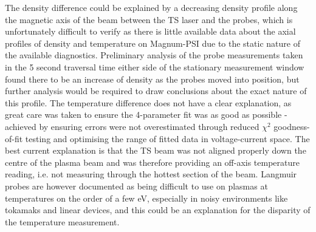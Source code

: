 \documentclass[a4paper, 11pt]{article} %
\begin{document}
	The density difference could be explained by a decreasing density profile along the magnetic axis of the beam between the TS laser and the probes, which is unfortunately difficult to verify as there is little available data about the axial profiles of density and temperature on Magnum-PSI due to the static nature of the available diagnostics.
	Preliminary analysis of the probe measurements taken in the 5 second traversal time either side of the stationary measurement window found there to be an increase of density as the probes moved into position, but further analysis would be required to draw conclusions about the exact nature of this profile.
	The temperature difference does not have a clear explanation, as great care was taken to ensure the 4-parameter fit was as good as possible - achieved by ensuring errors were not overestimated through reduced $\chi^2$ goodness-of-fit testing and optimising the range of fitted data in voltage-current space.
	The best current explanation is that the TS beam was not aligned properly down the centre of the plasma beam and was therefore providing an off-axis temperature reading, i.e. not measuring through the hottest section of the beam.
	Langmuir probes are however documented as being difficult to use on plasmas at temperatures on the order of a few eV\cite{Stangeby2000}, especially in noisy environments like tokamaks and linear devices, and this could be an explanation for the disparity of the temperature measurement.
	
\end{document}
